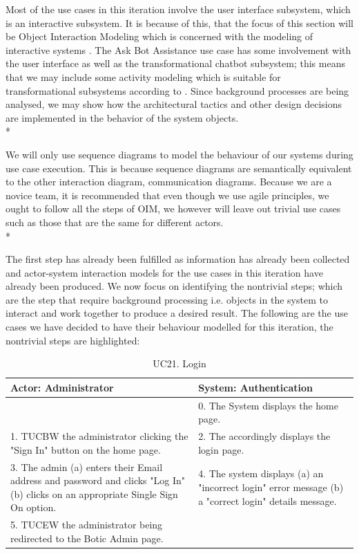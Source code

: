 \documentclass[11pt]{article}
\begin{document}
Most of the use cases in this iteration involve the user interface subsystem, which is an interactive subsystem. It is because of this, that the focus of this section will be Object Interaction Modeling which is concerned with the modeling of interactive systems \cite{Book:1}. The Ask Bot Assistance use case has some involvement with the user interface as well as the transformational chatbot subsystem; this means that we may include some activity modeling which is suitable for transformational subsystems according to \cite{Book:1}. Since background processes are being analysed, we may show how the architectural tactics and other design decisions are implemented in the behavior of the system objects.\\*

We will only use sequence diagrams to model the behaviour of our systems during use case execution. This is because sequence diagrams are semantically equivalent to the other interaction diagram, communication diagrams\cite{Book:1}. Because we are a novice team, it is recommended that even though we use agile principles, we ought to follow all the steps of OIM, we however will leave out trivial use cases such as those that are the same for different actors\cite{Book:1}.\\*

The first step has already been fulfilled as information has already been collected and actor-system interaction models for the use cases in this iteration have already been produced. We now focus on identifying the nontrivial steps; which are the step that require background processing i.e. objects in the system to interact and work together to produce a desired result. The following are the use cases we have decided to have their behaviour modelled for this iteration, the nontrivial steps are highlighted:

\begin{table}[h!]
	\centering
	\begin{tabular}{|p{8cm}|p{8cm}|}
		\hline
		Actor: Administrator & System: Authentication \\
		\hline
		 & 0. The System displays the home page.\\
		\hline
		1. TUCBW the administrator clicking the "Sign In" button on the home page. & 2. The accordingly displays the login page.\\
		\hline
		3. The admin (a) enters their Email address and password and clicks "Log In" (b) clicks on an appropriate Single Sign On option. &\cellcolor{blue} 4. The system displays (a) an "incorrect login" error message (b) a "correct login" details message. \\
		\hline
		5. \cellcolor{blue} TUCEW the administrator being redirected to the Botic Admin page. & \\
		\hline
	\end{tabular}
	\caption{UC21. Login}
\end{table}
\end{document}
